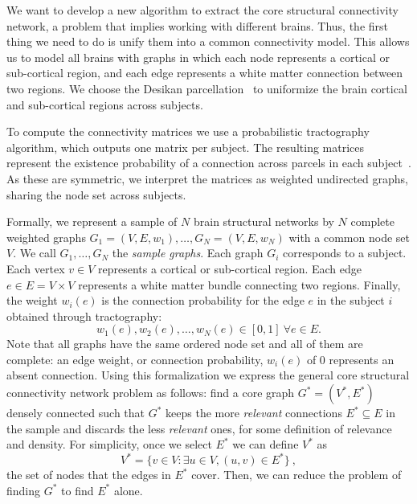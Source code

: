 We want to develop a new algorithm to extract the core structural connectivity network, a problem that implies working with different brains. Thus, the first thing we need to do is unify them into a common connectivity model. This allows us to model all brains with graphs in which each node represents a cortical or sub-cortical region, and each edge represents a white matter connection between two regions. We choose the Desikan parcellation~\cite{Desikan2006} to uniformize the brain cortical and sub-cortical regions across subjects.

To compute the connectivity matrices we use a probabilistic tractography algorithm, which outputs one matrix per subject. The resulting matrices represent the existence probability of a connection across parcels in each subject~\cite{Donahue2016}. As these are symmetric, we interpret the matrices as weighted undirected graphs, sharing the node set across subjects.

Formally, we represent a sample of $N$ brain structural networks by $N$ complete weighted graphs $G_{1} = (V, E, w_1), \ldots, G_N = (V, E, w_N)$ with a common node set $V$. We call $G_1,\ldots,G_N$ the \textit{sample graphs}. Each graph $G_i$ corresponds to a subject. Each vertex $v \in V$ represents a cortical or sub-cortical region. Each edge $e\in E=V\times V$ represents a white matter bundle connecting two regions. Finally, the weight $w_i(e)$ is the connection probability for the edge $e$ in the subject $i$ obtained through tractography:
\begin{equation}\label{all_weights}
w_1(e), w_2(e), \ldots, w_N(e) \in [0,1] ~ \forall e \in E.
\end{equation}
Note that all graphs have the same ordered node set and all of them are complete: an edge weight, or connection probability, $w_i(e)$ of 0 represents an absent connection. Using this formalization we express the general core structural connectivity network problem as follows: find a core graph $G^* = (V^*, E^*)$ densely connected such that $G^*$ keeps the more \emph{relevant} connections $E^*\subseteq E$ in the sample and discards the less \emph{relevant} ones, for some definition of relevance and density. %
For simplicity, once we select $E^*$ we can define $V^*$ as
\begin{equation}
V^* = \{v \in V : \exists u \in V, (u, v) \in E^*\} ~,
\end{equation}
the set of nodes that the edges in $E^*$ cover. Then, we can reduce the problem of finding $G^*$ to find $E^*$ alone.


